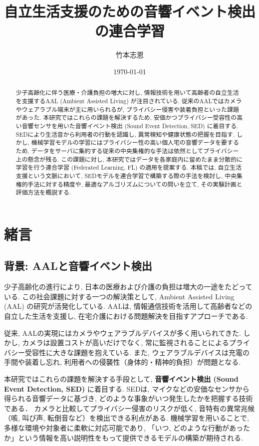 \documentclass[dvipdfmx, twocolumn, 10pt]{bxjsarticle}
\title{\textbf{自立生活支援のための音響イベント検出の連合学習}}
\author{竹本志恩}
\date{\today}
\begin{document}
\maketitle

\begin{abstract}
少子高齢化に伴う医療・介護負担の増大に対し, 情報技術を用いて高齢者の自立生活を支援するAAL (Ambient Assisted Living) が注目されている. 従来のAALではカメラやウェアラブル端末が主に用いられるが, プライバシー侵害や装着負担といった課題があった. 本研究ではこれらの課題を解決するため, 安価かつプライバシー受容性の高い音響センサを用いた音響イベント検出 (Sound Event Detection, SED) に着目する. SEDにより生活音から利用者の行動を認識し, 異常検知や健康状態の把握を目指す. しかし, 機械学習モデルの学習にはプライバシー性の高い個人宅の音響データを要するため, データをサーバに集約する従来の中央集権的な手法は依然としてプライバシー上の懸念が残る. この課題に対し, 本研究ではデータを各家庭内に留めたまま分散的に学習を行う連合学習 (Federated Learning, FL) の適用を提案する. 本稿では, 自立生活支援という文脈において, SEDモデルを連合学習で構築する際の手法を検討し, 中央集権的手法に対する精度や, 最適なアルゴリズムについての問いを立て, その実験計画と評価方法を概説する.
\end{abstract}


\section{緒言}

\subsection{背景: AALと音響イベント検出}
少子高齢化の進行により, 日本の医療および介護の負担は増大の一途をたどっている. 
この社会課題に対する一つの解決策として, Ambient Assisted Living (AAL) の研究が活発化している. 
AALは, 情報通信技術を活用して高齢者などの自立した生活を支援し, 在宅介護における問題解決を目指すアプローチである\cite{blackman2016ambient,stodczyk2020ambient}.

従来, AALの実現にはカメラやウェアラブルデバイスが多く用いられてきた. 
しかし, カメラは設置コストが高いだけでなく, 常に監視されることによるプライバシー受容性に大きな課題を抱えている. 
また, ウェアラブルデバイスは充電の手間や装着し忘れ, 利用者への侵襲性（身体的・精神的負担）が問題となる.

本研究ではこれらの課題を解決する手段として, \textbf{音響イベント検出 (Sound Event Detection, SED)} に着目する. 
SEDは, マイクなどの安価なセンサから得られる音響データに基づき, どのような事象がいつ発生したかを把握する技術である．
カメラと比較してプライバシー侵害のリスクが低く, 音特有の異常兆候（咳, 叫び声, 転倒音など）を検出できる利点がある. 
機械学習を用いることで, 多様な環境や対象者に柔軟に対応可能であり, 「いつ, どのような行動があったか」という情報を高い説明性をもって提供できるモデルの構築が期待される.
\end{document}
